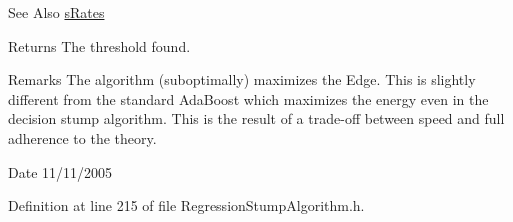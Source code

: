 \begin{DoxySeeAlso}{See Also}
\hyperlink{structMultiBoost_1_1sRates}{s\-Rates} 
\end{DoxySeeAlso}
\begin{DoxyReturn}{Returns}
The threshold found. 
\end{DoxyReturn}
\begin{DoxyRemark}{Remarks}
The algorithm (suboptimally) maximizes the Edge. This is slightly different from the standard Ada\-Boost which maximizes the energy even in the decision stump algorithm. This is the result of a trade-\/off between speed and full adherence to the theory. 
\end{DoxyRemark}
\begin{DoxyDate}{Date}
11/11/2005 
\end{DoxyDate}


Definition at line 215 of file Regression\-Stump\-Algorithm.\-h.

